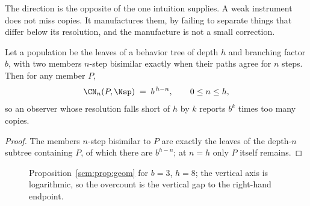 The direction is the opposite of the one intuition supplies. A weak
instrument does not miss copies. It manufactures them, by failing to
separate things that differ below its resolution, and the manufacture is
not a small correction.

\begin{proposition}
\label{scm:prop:geom}
Let a population be the leaves of a behavior tree of depth $h$ and
branching factor $b$, with two members $n$-step bisimilar exactly when
their paths agree for $n$ steps. Then for any member $P$,
\[
  \CN_n(P,\Nsp) \;=\; b^{\,h-n}, \qquad 0 \le n \le h,
\]
so an observer whose resolution falls short of $h$ by $k$ reports $b^{k}$
times too many copies.
\end{proposition}

\begin{proof}
The members $n$-step bisimilar to $P$ are exactly the leaves of the
depth-$n$ subtree containing $P$, of which there are $b^{h-n}$; at $n = h$
only $P$ itself remains.
\end{proof}

\begin{figure}[t]
\centering
{}
\caption{Proposition~\ref{scm:prop:geom} for $b=3$, $h=8$; the vertical
axis is logarithmic, so the overcount is the vertical gap to the
right-hand endpoint.}
\label{scm:fig:overcount}
\end{figure}

